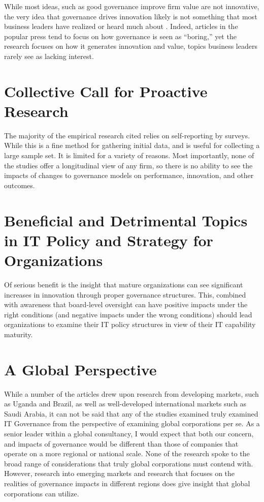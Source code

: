\documentclass[stu]{apa7}
\begin{document}
While most ideas, such as good governance improve firm value \parencite{wernickeCorporateGovernanceHow2019} are not innovative, the very idea that governance drives innovation likely is not something that most business leaders have realized or heard much about \parencite{prattRethinkingITGovernance2021}. Indeed, articles in the popular press tend to focus on how governance is seen as ``boring,'' yet the research focuses on how it generates innovation and value, topics business leaders rarely see as lacking interest.

\section{Collective Call for Proactive Research}
\label{sec:org2a65e1a}

The majority of the empirical research cited relies on self-reporting by surveys. While this is a fine method for gathering initial data, and is useful for collecting a large sample set. It is limited for a variety of reasons. Most importantly, none of the studies offer a longitudinal view of any firm, so there is no ability to see the impacts of changes to governance models on performance, innovation, and other outcomes.

\section{Beneficial and Detrimental Topics in IT Policy and Strategy for Organizations}
\label{sec:orge6b78f0}

Of serious benefit is the insight that mature organizations can see significant increases in innovation through proper governance structures. This, combined with awareness that board-level oversight can have positive impacts under the right conditions (and negative impacts under the wrong conditions) should lead organizations to examine their IT policy structures in view of their IT capability maturity.

\section{A Global Perspective}
\label{sec:org86628ca}

While a number of the articles drew upon research from developing markets, such as Uganda and Brazil, as well as well-developed international markets such as Saudi Arabia, it can not be said that any of the studies examined truly examined IT Governance from the perspective of examining global corporations per se. As a senior leader within a global consultancy, I would expect that both our concern, and impacts of governance would be different than those of companies that operate on a more regional or national scale. None of the research spoke to the broad range of considerations that truly global corporations must contend with. However, research into emerging markets and research that focuses on the realities of governance impacts in different regions does give insight that global corporations can utilize.


\printbibliography
\end{document}
